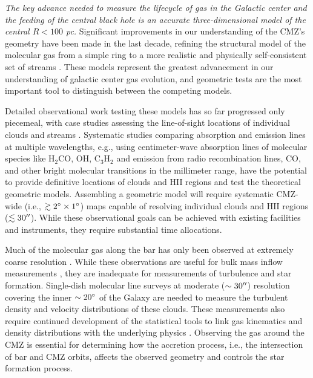\documentclass[modern]{aastex62}
\begin{document}
\textit{The key advance needed to measure the lifecycle of gas in the Galactic
center and the feeding of the central black hole is an accurate
three-dimensional model of the central $R<100$ pc.} Significant improvements in
our understanding
of the CMZ's geometry have been made in the last decade, refining the structural
model of the molecular gas from a simple ring to a more realistic and physically
self-consistent set of streams
\citep{Molinari2011a,Kruijssen2015a,Ridley2017a,Sormani2018a,Kruijssen2019b}.
These models represent the greatest advancement in our understanding of galactic
center gas evolution, and geometric tests are the most important tool to distinguish
between the competing models.

Detailed observational work testing these models has so far progressed only
piecemeal, with case studies assessing the line-of-sight locations of
individual clouds and streams \citep[e.g.,][]{Henshaw2016a,Butterfield2018a}.
Systematic studies
comparing absorption and emission lines at multiple wavelengths, e.g., using
centimeter-wave absorption lines of molecular species like H$_2$CO, OH,
C$_3$H$_2$ and emission from radio recombination lines, CO, and other bright
molecular transitions in the millimeter range, have the potential to provide
definitive locations of clouds and HII regions and test the theoretical
geometric models.  Assembling a geometric model will require systematic
CMZ-wide (i.e., $\gtrsim2^{\circ}\times1^{\circ}$) maps capable of resolving
individual clouds and HII regions ($\lesssim30\mbox{$^{\prime\prime}$}$).  While these
observational goals can be achieved with existing facilities and instruments,
they require substantial time allocations.

Much of the molecular gas along the bar has only been observed at extremely
coarse resolution \citep{Dame2001a}. While these observations are useful for
bulk mass inflow measurements \citep[e.g.,][]{Sormani2019a}, they are
inadequate for measurements of turbulence and star formation. Single-dish
molecular line surveys at moderate ($\sim30\mbox{$^{\prime\prime}$}$) resolution covering the
inner $\sim20^{\circ}$ of the Galaxy are needed to measure the turbulent
density and velocity distributions of these clouds. These measurements also
require continued development of the statistical tools to link gas kinematics
and density distributions with the underlying physics
\citep{Koch2017a,Burkhart2018a}.  Observing the gas around the CMZ is essential
for determining how the accretion process, i.e., the intersection of bar and
CMZ orbits, affects the observed geometry and controls the star formation
process.
\end{document}
